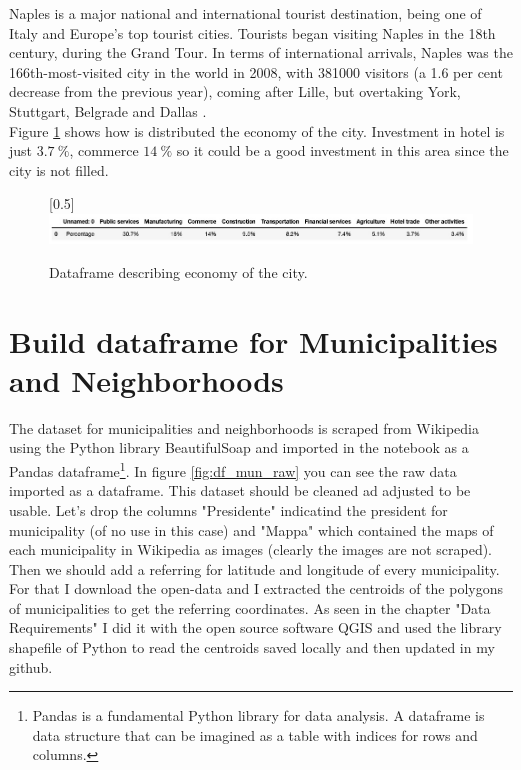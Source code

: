 \documentclass[a4paper, 12pt, oneside]{book}
\begin{document}
Naples is a major national and international tourist destination, being one of Italy and Europe's top tourist cities. Tourists began visiting Naples in the 18th century, during the Grand Tour. In terms of international arrivals, Naples was the 166th-most-visited city in the world in 2008, with 381000 visitors (a 1.6 per cent decrease from the previous year), coming after Lille, but overtaking York, Stuttgart, Belgrade and Dallas \cite{economics}.\\

Figure \ref{fig:df_economy} shows how is distributed the economy of the city. Investment in hotel is just $3.7~\%$, commerce $14~\%$ so it could be a good investment in this area since the city is not filled.

\begin{figure}[!htb]
		\centering
		\scalebox{0.45}[0.5]{\includegraphics{immagini/dataframe_economics.jpg}}
		\caption{Dataframe describing economy of the city. }
		\label{fig:df_economy}
	\end{figure}


\section*{Build dataframe for Municipalities and Neighborhoods} 
\label{sec:df_municipality}
The dataset for municipalities and neighborhoods is scraped from Wikipedia\cite{municipalities} using the Python library BeautifulSoap and imported in the notebook as a Pandas dataframe\footnote{Pandas is a fundamental Python library for data analysis. A dataframe is data structure that can be imagined as a table with indices for rows and columns.}. In figure \ref{fig:df_mun_raw} you can see the raw data imported as a dataframe.
This dataset should be cleaned ad adjusted to be usable. Let's drop the columns "Presidente" indicatind the president for municipality (of no use in this case) and "Mappa" which contained the maps of each municipality in Wikipedia as images (clearly the images are not scraped). Then we should add a referring for latitude and longitude of every municipality. For that I download the open-data \cite{opendata} and I extracted the centroids of the polygons of municipalities to get the referring coordinates. As seen in the chapter "Data Requirements" I did it with the open source software QGIS and used the library shapefile of Python to read the centroids saved locally and then updated in my github\cite{dataset}.  
\end{document}

